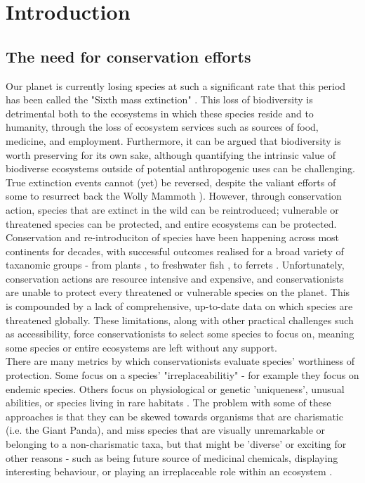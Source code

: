 \documentclass[11pt]{article}
\begin{document}
	
	\section{Introduction}
	\noindent

\subsection{The need for conservation efforts }
Our planet is currently losing species at such a significant rate that this 
period has been called the "Sixth mass extinction" 
\autocite{Barnosky2011}. This loss of biodiversity is detrimental both to the 
ecosystems in which these species reside and to humanity, through the loss of 
ecosystem services such as sources of food, medicine, and employment. 
Furthermore, it can be argued that biodiversity is worth preserving for its own 
sake, although quantifying the intrinsic value of biodiverse ecosystems outside 
of potential anthropogenic uses can be challenging. 
True extinction events cannot (yet) be reversed, despite the valiant efforts of 
some to resurrect back the Wolly Mammoth \autocite{Piotrowska2018}). However, 
through conservation action, species that are extinct in the wild can be 
reintroduced; vulnerable or threatened species can be protected, and entire 
ecosystems can be protected. Conservation and re-introduciton of species have 
been happening across most continents for decades, with successful outcomes 
realised for a broad variety of taxanomic groups - from plants 
\autocite{Godefroid2011}, to freshwater fish \autocite{Cochran-Biederman2015}, 
to ferrets \autocite{Jachowski2011}. Unfortunately, conservation actions are
resource intensive and expensive, and conservationists are unable to protect 
every threatened or vulnerable species on the planet. This is compounded by a 
lack of comprehensive, up-to-date data on which species are threatened 
globally. These limitations, along with other practical challenges such as 
accessibility, force conservationists to select some species to focus on, 
meaning some species or entire ecosystems are left without any support.
\\ 
 There 
are many metrics by which conservationists evaluate species' worthiness of 
protection. Some focus on a species' "irreplaceabilitiy" - for example they 
focus on endemic species. Others focus on 
physiological or genetic 'uniqueness', unusual abilities, or species living in 
rare habitats \autocite{Brooks2006}. The problem with some of these approaches 
is that they can be skewed towards organisms that are charismatic (i.e. the 
Giant Panda), and miss species that are visually unremarkable or belonging to a 
non-charismatic taxa, but that might be 'diverse' or exciting for other reasons 
- such as being future source of medicinal chemicals, displaying interesting 
behaviour, or playing an irreplaceable role within an ecosystem 
\autocite{Clark2002}. 
\\
\end{document}
